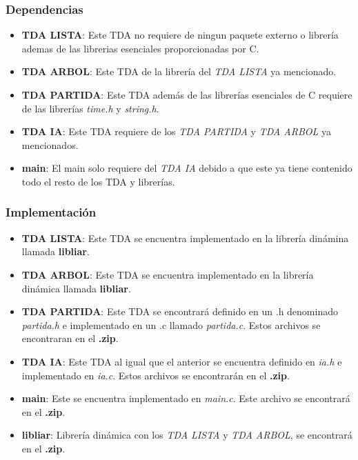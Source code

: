 \documentclass[12pt,a4paper]{article}
\begin{document}
\subsubsection{Dependencias}
\begin{itemize}
    \item {\bf TDA LISTA}: Este TDA no requiere de ningun paquete externo o librer\'ia ademas de las librerias esenciales proporcionadas por C.
    \item {\bf TDA ARBOL}: Este TDA de la librer\'ia del {\itshape TDA LISTA} ya mencionado.
    \item {\bf TDA PARTIDA}: Este TDA adem\'as de las librer\'ias esenciales de C requiere de las  librer\'ias {\itshape time.h} y {\itshape string.h}.
    \item {\bf TDA IA}: Este TDA requiere de los {\itshape TDA PARTIDA} y {\itshape TDA ARBOL} ya mencionados.
    \item {\bf main}: El main solo requiere del {\itshape TDA IA} debido a que este ya tiene contenido todo el resto de los TDA y librer\'ias.
\end{itemize}

\subsubsection{Implementaci\'on}
\begin{itemize}
    \item {\bf TDA LISTA}: Este TDA se encuentra implementado en la librer\'ia din\'amina llamada {\bf libliar}.
    \item {\bf TDA ARBOL}: Este TDA se encuentra implementado en la librer\'ia din\'amica llamada {\bf libliar}.
    \item {\bf TDA PARTIDA}: Este TDA se encontrar\'a definido en un .h denominado {\itshape partida.h} e implementado en un .c llamado {\itshape partida.c}. Estos archivos se encontraran en el {\bf .zip}.
    \item {\bf TDA IA}: Este TDA al igual que el anterior se encuentra definido en {\itshape ia.h} e implementado en {\itshape ia.c}. Estos archivos se encontrar\'an en el {\bf .zip}.
    \item {\bf main}: Este se encuentra implementado en {\itshape main.c}. Este archivo se encontrar\'a en el {\bf .zip}.
    \item {\bf libliar}: Librer\'ia din\'amica con los {\itshape TDA LISTA} y {\itshape TDA ARBOL}, se encontrar\'a en el {\bf .zip}.
\end{itemize}
\end{document}
